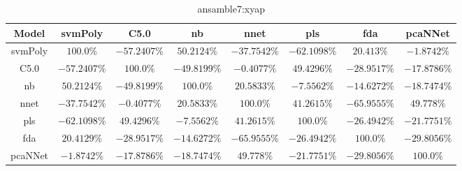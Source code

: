 \begin{table}[!ht]
	\centering
	\begin{tabular}{|c|c|c|c|c|c|c|c|}
		\hline
		Model & svmPoly & C5.0 & nb & nnet & pls & fda & pcaNNet \\ \hline
		svmPoly & $100.0\%$ & $-57.2407\%$ & $50.2124\%$ & $-37.7542\%$ & $-62.1098\%$ & $20.413\%$ & $-1.8742\%$ \\ \hline
		C5.0 & $-57.2407\%$ & $100.0\%$ & $-49.8199\%$ & $-0.4077\%$ & $49.4296\%$ & $-28.9517\%$ & $-17.8786\%$ \\ \hline
		nb & $50.2124\%$ & $-49.8199\%$ & $100.0\%$ & $20.5833\%$ & $-7.5562\%$ & $-14.6272\%$ & $-18.7474\%$ \\ \hline
		nnet & $-37.7542\%$ & $-0.4077\%$ & $20.5833\%$ & $100.0\%$ & $41.2615\%$ & $-65.9555\%$ & $49.778\%$ \\ \hline
		pls & $-62.1098\%$ & $49.4296\%$ & $-7.5562\%$ & $41.2615\%$ & $100.0\%$ & $-26.4942\%$ & $-21.7751\%$ \\ \hline
		fda & $20.4129\%$ & $-28.9517\%$ & $-14.6272\%$ & $-65.9555\%$ & $-26.4942\%$ & $100.0\%$ & $-29.8056\%$ \\ \hline
		pcaNNet & $-1.8742\%$ & $-17.8786\%$ & $-18.7474\%$ & $49.778\%$ & $-21.7751\%$ & $-29.8056\%$ & $100.0\%$ \\ \hline
	\end{tabular}
	\caption{ansamble7:xyap}
	\label{tab:ansamble7:xyap}
\end{table}
